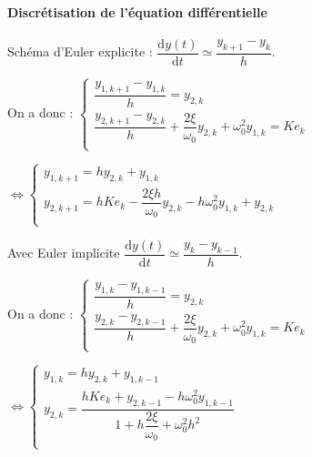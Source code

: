 \paragraph*{Discrétisation de l'équation différentielle}

Schéma d'Euler explicite :   $\dfrac{\text{d} y(t)}{\text{d}t}\simeq \dfrac{y_{k+1}-y_k}{h}$. 

On a donc :
$
\left\{
\begin{array}{l}
\dfrac{y_{1,k+1}-y_{1,k}}{h} = y_{2,k} \\
\dfrac{y_{2,k+1}-y_{2,k}}{h} + \dfrac{2\xi}{\omega_0} y_{2,k}+ \omega_0^2 y_{1,k} = Ke_k \\
\end{array}
\right.
$ 

$\Leftrightarrow 
\left\{
\begin{array}{l}
y_{1,k+1} = h y_{2,k} +y_{1,k} \\
y_{2,k+1}  = hKe_k - \dfrac{2\xi h}{\omega_0} y_{2,k}- h\omega_0^2 y_{1,k} + y_{2,k}\\
\end{array}
\right.
$ 


Avec Euler implicite $\dfrac{\text{d} y(t)}{\text{d}t}\simeq \dfrac{y_{k}-y_{k-1}}{h}$. 

On a donc :
$
\left\{
\begin{array}{l}
\dfrac{y_{1,k}-y_{1,k-1}}{h} = y_{2,k} \\
\dfrac{y_{2,k}-y_{2,k-1}}{h} + \dfrac{2\xi}{\omega_0} y_{2,k}+ \omega_0^2 y_{1,k} = Ke_k \\
\end{array}
\right.$

$
\Leftrightarrow 
\left\{
\begin{array}{l}
y_{1,k} = hy_{2,k}+y_{1,k-1} \\
y_{2,k} =\dfrac{h Ke_k+y_{2,k-1} - h\omega_0^2 y_{1,k-1}}{1+  h \dfrac{2\xi}{\omega_0} +  \omega_0^2 h^2 } \\
\end{array}
\right.$




